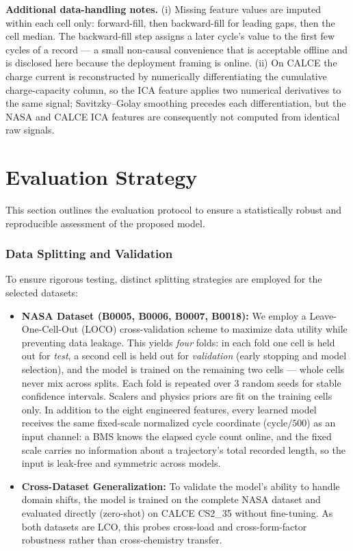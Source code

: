 \noindent
\textbf{Additional data-handling notes.} (i) Missing feature values are imputed
within each cell only: forward-fill, then backward-fill for leading gaps, then the
cell median. The backward-fill step assigns a later cycle's value to the first few
cycles of a record --- a small non-causal convenience that is acceptable offline
and is disclosed here because the deployment framing is online. (ii) On CALCE the
charge current is reconstructed by numerically differentiating the cumulative
charge-capacity column, so the ICA feature applies two numerical derivatives to
the same signal; Savitzky--Golay smoothing precedes each differentiation, but the
NASA and CALCE ICA features are consequently not computed from identical raw
signals.

\section{Evaluation Strategy}
\label{sec:evaluation_strategy}

This section outlines the evaluation protocol to ensure a statistically robust and reproducible assessment of the proposed model.

\subsubsection{Data Splitting and Validation}
To ensure rigorous testing, distinct splitting strategies are employed for the selected datasets:
\begin{itemize}
    \item \textbf{NASA Dataset (B0005, B0006, B0007, B0018):}
    We employ a Leave-One-Cell-Out (LOCO) cross-validation scheme to maximize data
    utility while preventing data leakage. This yields \emph{four} folds: in each
    fold one cell is held out for \emph{test}, a second cell is held out for
    \emph{validation} (early stopping and model selection), and the model is
    trained on the remaining two cells --- whole cells never mix across splits.
    Each fold is repeated over 3 random seeds for stable confidence intervals.
    Scalers and physics priors are fit on the training cells only. In addition
    to the eight engineered features, every learned model receives the same
    fixed-scale normalized cycle coordinate ($\mathrm{cycle}/500$) as an input
    channel: a BMS knows the elapsed cycle count online, and the fixed scale
    carries no information about a trajectory's total recorded length, so the
    input is leak-free and symmetric across models.
    \item \textbf{Cross-Dataset Generalization:}
    To validate the model's ability to handle domain shifts, the model is trained on
    the complete NASA dataset and evaluated directly (zero-shot) on CALCE CS2\_35
    without fine-tuning. As both datasets are LCO, this probes cross-load and
    cross-form-factor robustness rather than cross-chemistry transfer.
\end{itemize}

